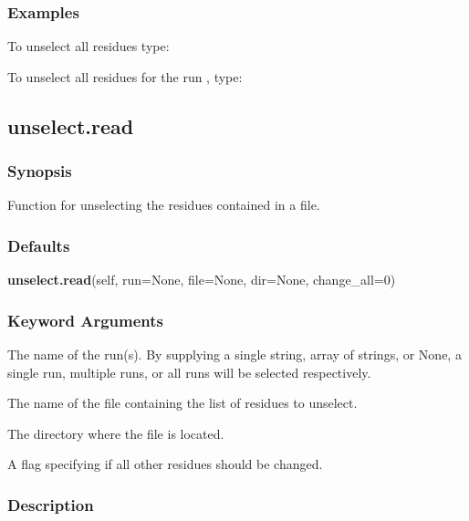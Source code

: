 \subsubsection{Examples}

To unselect all residues type:



To unselect all residues for the run , type:






\newpage

\subsection{unselect.read}


\subsubsection{Synopsis}

Function for unselecting the residues contained in a file.



\subsubsection{Defaults}

\textsf{\textbf{unselect.read}(self, run=None, file=None, dir=None, change\_all=0)}


\subsubsection{Keyword Arguments}

  The name of the run(s).  By supplying a single string, array of strings, or None, a single run, multiple runs, or all runs will be selected respectively. 

  The name of the file containing the list of residues to unselect. 

  The directory where the file is located. 

  A flag specifying if all other residues should be changed. 




\subsubsection{Description}

